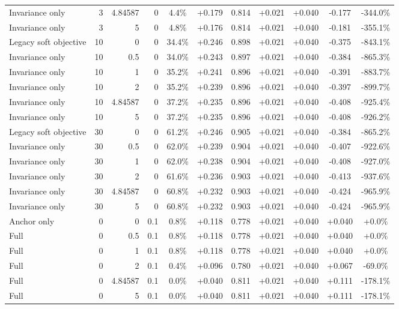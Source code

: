 \begin{table}[htbp]
\begin{tabular}{lrrrccccccc}
Invariance only & 3 & 4.84587 & 0 & 4.4\% & +0.179 & 0.814 & +0.021 & +0.040 & -0.177 & -344.0\% \\
Invariance only & 3 & 5 & 0 & 4.8\% & +0.176 & 0.814 & +0.021 & +0.040 & -0.181 & -355.1\% \\
Legacy soft objective & 10 & 0 & 0 & 34.4\% & +0.246 & 0.898 & +0.021 & +0.040 & -0.375 & -843.1\% \\
Invariance only & 10 & 0.5 & 0 & 34.0\% & +0.243 & 0.897 & +0.021 & +0.040 & -0.384 & -865.3\% \\
Invariance only & 10 & 1 & 0 & 35.2\% & +0.241 & 0.896 & +0.021 & +0.040 & -0.391 & -883.7\% \\
Invariance only & 10 & 2 & 0 & 35.2\% & +0.239 & 0.896 & +0.021 & +0.040 & -0.397 & -899.7\% \\
Invariance only & 10 & 4.84587 & 0 & 37.2\% & +0.235 & 0.896 & +0.021 & +0.040 & -0.408 & -925.4\% \\
Invariance only & 10 & 5 & 0 & 37.2\% & +0.235 & 0.896 & +0.021 & +0.040 & -0.408 & -926.2\% \\
Legacy soft objective & 30 & 0 & 0 & 61.2\% & +0.246 & 0.905 & +0.021 & +0.040 & -0.384 & -865.2\% \\
Invariance only & 30 & 0.5 & 0 & 62.0\% & +0.239 & 0.904 & +0.021 & +0.040 & -0.407 & -922.6\% \\
Invariance only & 30 & 1 & 0 & 62.0\% & +0.238 & 0.904 & +0.021 & +0.040 & -0.408 & -927.0\% \\
Invariance only & 30 & 2 & 0 & 61.6\% & +0.236 & 0.903 & +0.021 & +0.040 & -0.413 & -937.6\% \\
Invariance only & 30 & 4.84587 & 0 & 60.8\% & +0.232 & 0.903 & +0.021 & +0.040 & -0.424 & -965.9\% \\
Invariance only & 30 & 5 & 0 & 60.8\% & +0.232 & 0.903 & +0.021 & +0.040 & -0.424 & -965.9\% \\
Anchor only & 0 & 0 & 0.1 & 0.8\% & +0.118 & 0.778 & +0.021 & +0.040 & +0.040 & +0.0\% \\
Full & 0 & 0.5 & 0.1 & 0.8\% & +0.118 & 0.778 & +0.021 & +0.040 & +0.040 & +0.0\% \\
Full & 0 & 1 & 0.1 & 0.8\% & +0.118 & 0.778 & +0.021 & +0.040 & +0.040 & +0.0\% \\
Full & 0 & 2 & 0.1 & 0.4\% & +0.096 & 0.780 & +0.021 & +0.040 & +0.067 & -69.0\% \\
Full & 0 & 4.84587 & 0.1 & 0.0\% & +0.040 & 0.811 & +0.021 & +0.040 & +0.111 & -178.1\% \\
Full & 0 & 5 & 0.1 & 0.0\% & +0.040 & 0.811 & +0.021 & +0.040 & +0.111 & -178.1\% \\

\end{tabular}
\end{table}
